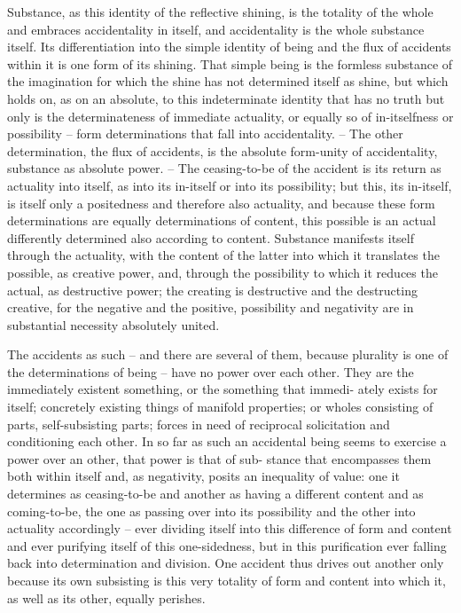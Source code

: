 Substance, as this identity of the reflective shining, is the totality of the
whole and embraces accidentality in itself, and accidentality is the whole
substance itself. Its differentiation into the simple identity of being and the
flux of accidents within it is one form of its shining. That simple being
is the formless substance of the imagination for which the shine has not
determined itself as shine, but which holds on, as on an absolute, to this
indeterminate identity that has no truth but only is the determinateness
of immediate actuality, or equally so of in-itselfness or possibility – form
determinations that fall into accidentality. –
The other determination, the flux of accidents, is the absolute form-unity
of accidentality, substance as absolute power. – The ceasing-to-be of the
accident is its return as actuality into itself, as into its in-itself or into its
possibility; but this, its in-itself, is itself only a positedness and therefore also
actuality, and because these form determinations are equally determinations
of content, this possible is an actual differently determined also according to
content. Substance manifests itself through the actuality, with the content
of the latter into which it translates the possible, as creative power, and,
through the possibility to which it reduces the actual, as destructive power;
the creating is destructive and the destructing creative, for the negative and
the positive, possibility and negativity are in substantial necessity absolutely
united.

The accidents as such – and there are several of them, because plurality is
one of the determinations of being – have no power over each other. They
are the immediately existent something, or the something that immedi-
ately exists for itself; concretely existing things of manifold properties; or
wholes consisting of parts, self-subsisting parts; forces in need of reciprocal
solicitation and conditioning each other. In so far as such an accidental
being seems to exercise a power over an other, that power is that of sub-
stance that encompasses them both within itself and, as negativity, posits
an inequality of value: one it determines as ceasing-to-be and another as
having a different content and as coming-to-be, the one as passing over into
its possibility and the other into actuality accordingly – ever dividing itself
into this difference of form and content and ever purifying itself of this
one-sidedness, but in this purification ever falling back into determination
and division.
One accident thus drives out another only because its own
subsisting is this very totality of form and content into which it, as well as
its other, equally perishes.

